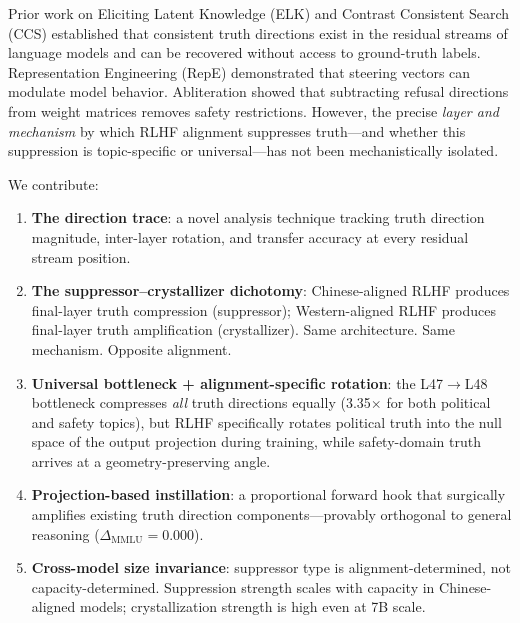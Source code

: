 \documentclass[12pt]{article}
\theoremstyle{definition}
\begin{document}
Prior work on Eliciting Latent Knowledge (ELK) \citep{christiano2022elk} and Contrast
Consistent Search (CCS) \citep{burns2022discovering} established that consistent truth
directions exist in the residual streams of language models and can be recovered without
access to ground-truth labels. Representation Engineering (RepE) \citep{zou2023representation}
demonstrated that steering vectors can modulate model behavior. Abliteration
\citep{arditi2024refusal} showed that subtracting refusal directions from weight matrices
removes safety restrictions. However, the precise \emph{layer and mechanism} by which
RLHF alignment suppresses truth---and whether this suppression is topic-specific or
universal---has not been mechanistically isolated.

We contribute:
\begin{enumerate}
  \item \textbf{The direction trace}: a novel analysis technique tracking truth direction
  magnitude, inter-layer rotation, and transfer accuracy at every residual stream position.

  \item \textbf{The suppressor--crystallizer dichotomy}: Chinese-aligned RLHF produces
  final-layer truth compression (suppressor); Western-aligned RLHF produces final-layer
  truth amplification (crystallizer). Same architecture. Same mechanism. Opposite alignment.

  \item \textbf{Universal bottleneck + alignment-specific rotation}: the L47$\to$L48
  bottleneck compresses \emph{all} truth directions equally (3.35$\times$ for both political
  and safety topics), but RLHF specifically rotates political truth into the null space of
  the output projection during training, while safety-domain truth arrives at a
  geometry-preserving angle.

  \item \textbf{Projection-based instillation}: a proportional forward hook that surgically
  amplifies existing truth direction components---provably orthogonal to general reasoning
  ($\Delta_\text{MMLU} = 0.000$).

  \item \textbf{Cross-model size invariance}: suppressor type is alignment-determined,
  not capacity-determined. Suppression strength scales with capacity in Chinese-aligned
  models; crystallization strength is high even at 7B scale.
\end{enumerate}
\end{document}
